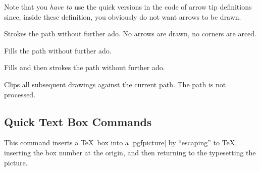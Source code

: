 Note that you \emph{have to} use the quick versions in the code of
arrow tip definitions since, inside these definition, you obviously do
not want arrows to be drawn.

\begin{command}{\pgfusepathqstroke}
  Strokes the path without further ado. No arrows are drawn, no
  corners are arced.

\begin{codeexample}[]
\begin{pgfpicture}
  \pgfpathqcircle{5pt}
  \pgfusepathqstroke
\end{pgfpicture}
\end{codeexample}
\end{command}

\begin{command}{\pgfusepathqfill}
  Fills the path without further ado.
\end{command}

\begin{command}{\pgfusepathqfillstroke}
  Fills and then strokes the path without further ado.
\end{command}

\begin{command}{\pgfusepathqclip}
  Clips all subsequent drawings against the current path. The path is
  not processed.
\end{command}


\subsection{Quick Text Box Commands}

\begin{command}{\pgfqbox{}}
  This command inserts a \TeX\ box into a |{pgfpicture}| by
  ``escaping'' to \TeX, inserting the box number  at
  the origin, and then returning to the typesetting the picture.
\end{command}

